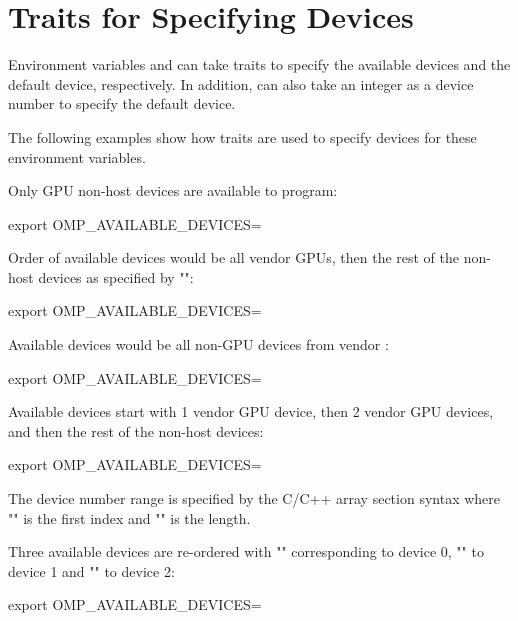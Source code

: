 \pagebreak
\section{Traits for Specifying Devices}
\label{sec:device_env_traits}


Environment variables  and
 can take traits to specify the available
devices and the default device, respectively.
In addition,  can also take an integer
as a device number to specify the default device.

The following examples show how traits are used to specify devices
for these environment variables.

Only GPU non-host devices are available to program:
\begin{boxedcode}
export OMP_AVAILABLE_DEVICES= 
\end{boxedcode}

Order of available devices would be all vendor  GPUs, then 
the rest of the non-host devices as specified by "\ucode{*}":
\begin{boxedcode}
export OMP_AVAILABLE_DEVICES=
\end{boxedcode}

Available devices would be all non-GPU devices from vendor :
\begin{boxedcode}
export OMP_AVAILABLE_DEVICES=
\end{boxedcode}

Available devices start with 1 vendor  GPU device, then 
2 vendor  GPU devices, and then the rest of the non-host devices:
\begin{boxedcode}
export OMP_AVAILABLE_DEVICES=
\end{boxedcode}
The device number range is specified by the C/C++ array section syntax
\ucode{[0:2]} where "" is the first index and ""
is the length.

Three available devices are re-ordered with "" corresponding 
to device 0, "" to device 1 and ""
to device 2:
\begin{boxedcode}
export OMP_AVAILABLE_DEVICES=
\end{boxedcode}

